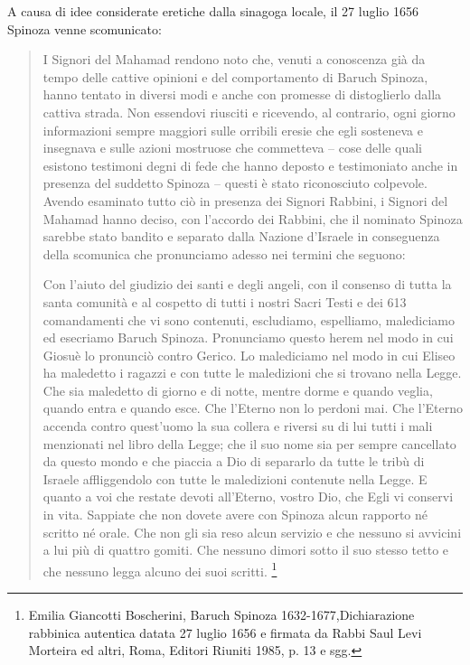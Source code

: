 \documentclass[a4paper,12pt,notitlepage]{report}
\begin{document}
	A causa di idee considerate eretiche dalla sinagoga locale, il 27 luglio 1656 Spinoza venne scomunicato:
	\begin{quotation}
		\small I Signori del Mahamad rendono noto che, venuti a conoscenza già da tempo delle cattive opinioni e del comportamento di Baruch Spinoza, hanno tentato in diversi modi e anche con promesse di distoglierlo dalla cattiva strada. Non essendovi riusciti e ricevendo, al contrario, ogni giorno informazioni sempre maggiori sulle orribili eresie che egli sosteneva e insegnava e sulle azioni mostruose che commetteva – cose delle quali esistono testimoni degni di fede che hanno deposto e testimoniato anche in presenza del suddetto Spinoza – questi è stato riconosciuto colpevole. Avendo esaminato tutto ciò in presenza dei Signori Rabbini, i Signori del Mahamad hanno deciso, con l'accordo dei Rabbini, che il nominato Spinoza sarebbe stato bandito e separato dalla Nazione d'Israele in conseguenza della scomunica che pronunciamo adesso nei termini che seguono:
		
		Con l'aiuto del giudizio dei santi e degli angeli, con il consenso di tutta la santa comunità e al cospetto di tutti i nostri Sacri Testi e dei 613 comandamenti che vi sono contenuti, escludiamo, espelliamo, malediciamo ed esecriamo Baruch Spinoza. Pronunciamo questo herem nel modo in cui Giosuè lo pronunciò contro Gerico. Lo malediciamo nel modo in cui Eliseo ha maledetto i ragazzi e con tutte le maledizioni che si trovano nella Legge. Che sia maledetto di giorno e di notte, mentre dorme e quando veglia, quando entra e quando esce. Che l'Eterno non lo perdoni mai. Che l'Eterno accenda contro quest'uomo la sua collera e riversi su di lui tutti i mali menzionati nel libro della Legge; che il suo nome sia per sempre cancellato da questo mondo e che piaccia a Dio di separarlo da tutte le tribù di Israele affliggendolo con tutte le maledizioni contenute nella Legge. E quanto a voi che restate devoti all'Eterno, vostro Dio, che Egli vi conservi in vita. Sappiate che non dovete avere con Spinoza alcun rapporto né scritto né orale. Che non gli sia reso alcun servizio e che nessuno si avvicini a lui più di quattro gomiti. Che nessuno dimori sotto il suo stesso tetto e che nessuno legga alcuno dei suoi scritti. \footnote{ Emilia Giancotti Boscherini, Baruch Spinoza 1632-1677,Dichiarazione rabbinica autentica datata 27 luglio 1656 e firmata da Rabbi Saul Levi Morteira ed altri, Roma, Editori Riuniti 1985, p. 13 e sgg.}
	\end{quotation}
\end{document}
